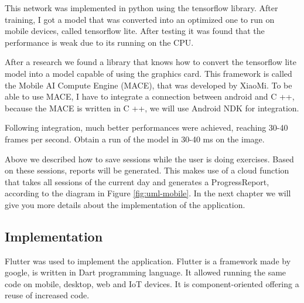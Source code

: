 This network was implemented in python using the tensorflow library. After training, I got a model that was converted into an optimized one to run on mobile devices, called tensorflow lite.
After testing it was found that the performance is weak due to its running on the CPU.

After a research we found a library that knows how to convert the tensorflow lite model into a model capable of using the graphics card. This framework is called the Mobile AI Compute Engine (MACE), that was developed by XiaoMi. To be able to use MACE, I have to integrate a connection between android and C ++, because the MACE is written in C ++, we will use Android NDK for integration.

Following integration, much better performances were achieved, reaching 30-40 frames per second. Obtain a run of the model in 30-40 ms on the image.

Above we described how to save sessions while the user is doing exercises.
Based on these sessions, reports will be generated. This makes use of a cloud function that takes all sessions of the current day and generates a ProgressReport, according to the diagram in Figure \ref{fig:uml-mobile}.
In the next chapter we will give you more details about the implementation of the application.

\subsection{Implementation}
Flutter was used to implement the application.
Flutter is a framework made by google, is written in Dart programming language. It allowed running the same code on mobile, desktop, web and IoT devices. It is component-oriented offering a reuse of increased code.

